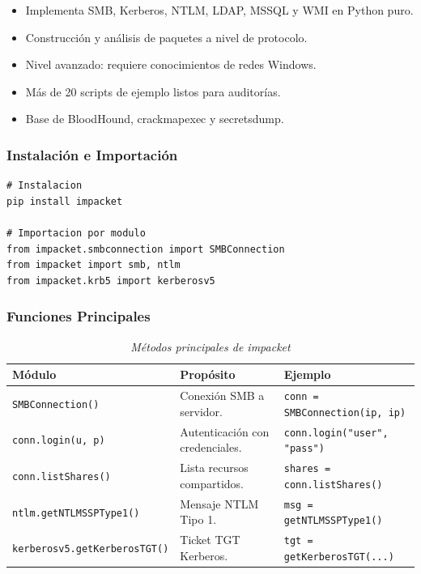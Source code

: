 \documentclass[12pt,a4paper]{article}
\begin{document}
\begin{itemize}
\item Implementa SMB, Kerberos, NTLM, LDAP, MSSQL y WMI en Python puro.
\item Construcción y análisis de paquetes a nivel de protocolo.
\item Nivel avanzado: requiere conocimientos de redes Windows.
\item Más de 20 scripts de ejemplo listos para auditorías.
\item Base de BloodHound, crackmapexec y secretsdump.
\end{itemize}

\subsubsection{Instalación e Importación}

\begin{lstlisting}[caption={Instalación e importación modular de impacket},
                   label=lst:impacket_install]
# Instalacion
pip install impacket

# Importacion por modulo
from impacket.smbconnection import SMBConnection
from impacket import smb, ntlm
from impacket.krb5 import kerberosv5
\end{lstlisting}

\subsubsection{Funciones Principales}

\begin{table}[H]
\centering\footnotesize
\begin{threeparttable}
\caption{\textit{Métodos principales de impacket}}
\begin{tabular}{p{5cm}p{3.8cm}p{3.7cm}}
\toprule
\textbf{Módulo} & \textbf{Propósito} & \textbf{Ejemplo} \\
\midrule
\texttt{SMBConnection()} & Conexión SMB a servidor. & \texttt{conn = SMBConnection(ip, ip)} \\
\texttt{conn.login(u, p)} & Autenticación con credenciales. & \texttt{conn.login("user", "pass")} \\
\texttt{conn.listShares()} & Lista recursos compartidos. & \texttt{shares = conn.listShares()} \\
\texttt{ntlm.getNTLMSSPType1()} & Mensaje NTLM Tipo 1. & \texttt{msg = getNTLMSSPType1()} \\
\texttt{kerberosv5.getKerberosTGT()} & Ticket TGT Kerberos. & \texttt{tgt = getKerberosTGT(...)} \\
\bottomrule
\end{tabular}
\end{threeparttable}
\end{table}
\end{document}
